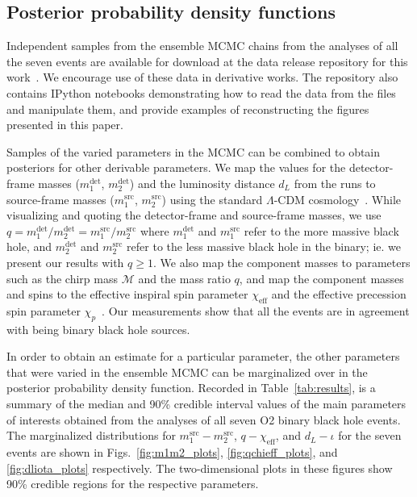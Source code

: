 \subsection{Posterior probability density functions}\label{sec:results}

Independent samples from the ensemble MCMC chains from the analyses of all the seven events are available for download at the data release repository for this work~\cite{data_release}. We encourage use of these data in derivative works. The repository also contains IPython notebooks \cite{PER-GRA:2007} demonstrating how to read the data from the files and manipulate them, and provide examples of reconstructing the figures presented in this paper.


Samples of the varied parameters in the MCMC can be combined to obtain posteriors for other derivable parameters. We map the values for the detector-frame masses ($m_{1}^{\mathrm{det}}$, $m_{2}^{\mathrm{det}}$) and the luminosity distance $d_L$ from the runs to source-frame masses ($m_{1}^{\mathrm{src}}$, $m_{2}^{\mathrm{src}}$) using the standard $\Lambda$-CDM cosmology~\cite{Schutz:1986gp,Finn:1992xs}. While visualizing and quoting the detector-frame and source-frame masses, we use $q = m_1^\mathrm{det} / m_2^\mathrm{det} =  m_1^\mathrm{src} / m_2^\mathrm{src}$ where $m_1^\mathrm{det}$ and $m_1^\mathrm{src}$ refer to the more massive black hole, and $m_2^\mathrm{det}$ and $m_2^\mathrm{src}$ refer to the less massive black hole in the binary; ie. we present our results with $q \geq 1$. We also map the component masses to parameters such as the chirp mass $\mathcal{M}$ and the mass ratio $q$, and map the component masses and spins to the effective inspiral spin parameter $\chi_{\mathrm{eff}}$ and the effective precession spin parameter $\chi_p$~\cite{Schmidt:2014iyl,Hannam:2013oca}. Our measurements show that all the events are in agreement with being binary black hole sources.


In order to obtain an estimate for a particular parameter, the other parameters that were varied in the ensemble MCMC can be marginalized over in the posterior probability density function. Recorded in Table~\ref{tab:results}, is a summary of the median and 90\% credible interval values of the main parameters of interests obtained from the analyses of all seven O2 binary black hole events.
The marginalized distributions for $m_1^{\mathrm{src}} - m_2^{\mathrm{src}}$, $q - \chi_{\mathrm{eff}}$, and $d_L - \iota$ for the seven events are shown in  Figs.~\ref{fig:m1m2_plots}, \ref{fig:qchieff_plots}, and \ref{fig:dliota_plots} respectively.
The two-dimensional plots in these figures show 90\% credible regions for the respective parameters.

